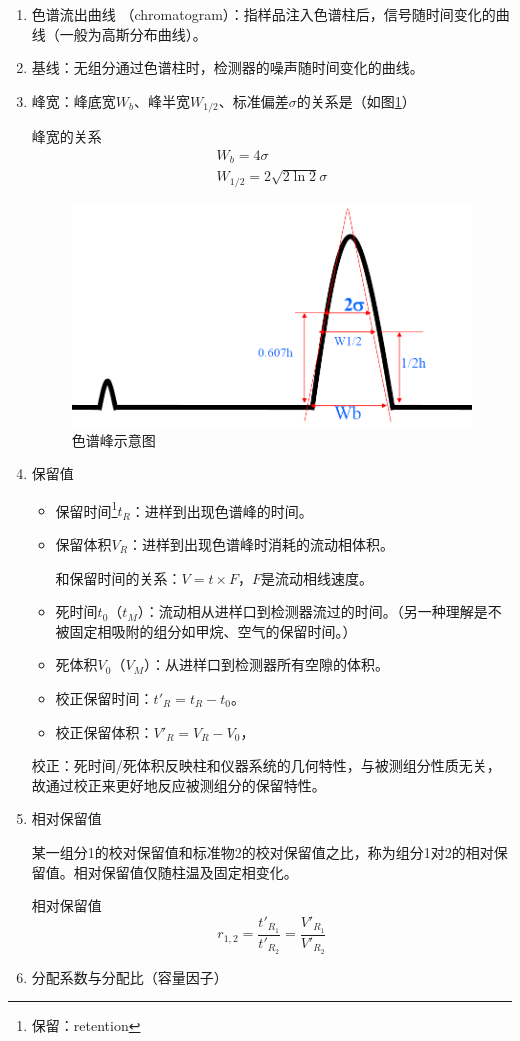 \begin{enumerate}
	\item 色谱流出曲线 （chromatogram）：指样品注入色谱柱后，信号随时间变化的曲线（一般为高斯分布曲线）。
	\item 基线：无组分通过色谱柱时，检测器的噪声随时间变化的曲线。
	\item 峰宽：峰底宽$W_b$、峰半宽$W_{1/2}$、标准偏差$\sigma$的关系是（如图\ref{fig:chp1peak}）
	\begin{theorem*}{峰宽的关系}{}
		\begin{gather*}
			W_b=4\sigma\\
			W_{1/2}=2\sqrt{2\ln 2}\sigma
		\end{gather*}
	\end{theorem*}
	\begin{figure}[!h]
		\centering
		\includegraphics[width=0.55\linewidth]{image/chp1_peak}
		\caption{色谱峰示意图}
		\label{fig:chp1peak}
	\end{figure}
	\item 保留值
	\begin{itemize}
		\item 保留时间\footnote{保留：retention}$t_R$：进样到出现色谱峰的时间。
		\item 保留体积$V_R$：进样到出现色谱峰时消耗的流动相体积。
		
		和保留时间的关系：$V=t\times F$，$F$是流动相线速度。
		\item 死时间$t_0$（$t_M$）：流动相从进样口到检测器流过的时间。（另一种理解是不被固定相吸附的组分如甲烷、空气的保留时间。）
		\item 死体积$V_0$（$V_M$）：从进样口到检测器所有空隙的体积。
		\item 校正保留时间：$t'_R=t_R- t_0$。
		\item 校正保留体积：$V'_R=V_R- V_0$，
	\end{itemize}
	
	校正：死时间/死体积反映柱和仪器系统的几何特性，与被测组分性质无关，故通过校正来更好地反应被测组分的保留特性。
	\item 相对保留值
	
	某一组分1的校对保留值和标准物2的校对保留值之比，称为组分1对2的相对保留值。相对保留值仅随柱温及固定相变化。
	\begin{theorem*}{相对保留值}{}
		\begin{equation*}
			r_{1,2}=\dfrac{t'_{R_1}}{t'_{R_2}}=\dfrac{V'_{R_1}}{V'_{R_2}}
		\end{equation*}
	\end{theorem*}
	\item 分配系数与分配比（容量因子）
	

\end{enumerate}
